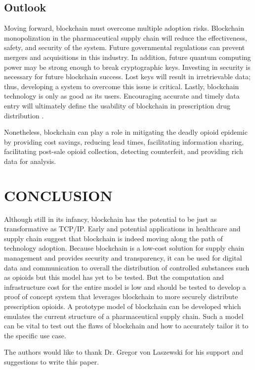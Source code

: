 \documentclass[sigconf]{acmart}
\begin{document}
\subsection{Outlook}
Moving forward, blockchain must overcome multiple adoption risks. Blockchain monopolization in the pharmaceutical supply chain will reduce the effectiveness, safety, and security of the system. Future governmental regulations can prevent mergers and acquisitions in this industry. In addition, future quantum computing power may be strong enough to break cryptographic keys. Investing in security is necessary for future blockchain success. Lost keys will result in irretrievable data; thus, developing a system to overcome this issue is critical. Lastly, blockchain technology is only as good as its users. Encouraging accurate and timely data entry will ultimately define the usability of blockchain in prescription drug distribution \cite{hitchingHealthcare}.

Nonetheless, blockchain can play a role in mitigating the deadly opioid epidemic by providing cost savings, reducing lead times, facilitating information sharing, facilitating post-sale opioid collection, detecting counterfeit, and providing rich data for analysis.

\section{CONCLUSION}
Although still in its infancy, blockchain has the potential to be just as transformative as TCP/IP. Early and potential applications in healthcare and supply chain suggest that blockchain is indeed moving along the path of technology adoption. Because blockchain is a low-cost solution for supply chain management and provides security and transparency, it can be used for digital data and communication to overall the distribution of controlled substances such as opioids but this model has yet to be tested. But the computation and infrastructure cost for the entire model is low and should be tested to develop a proof of concept system that leverages blockchain to more securely distribute prescription opioids. A prototype model of blockchain can be developed which emulates the current structure of a pharmaceutical supply chain. Such a model can be vital to test out the flaws of blockchain and how to accurately tailor it to the specific use case.  

\begin{acks}
The authors would like to thank Dr. Gregor von Laszewski for his support and suggestions to write this paper.
\end{acks}


 
\end{document}
